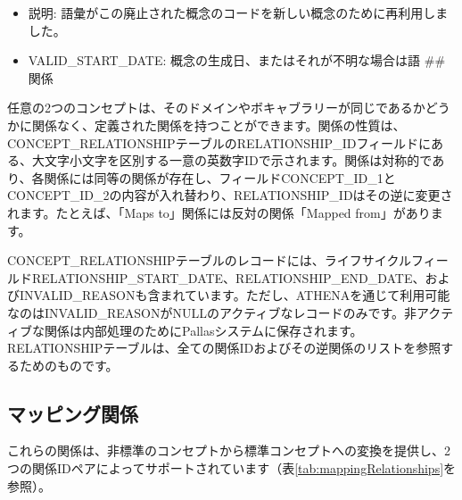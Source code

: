 \documentclass[
  11pt]{book}
\providecommand{\tightlist}{%
  \setlength{\itemsep}{0pt}\setlength{\parskip}{0pt}}
\theoremstyle{definition}
\theoremstyle{definition}
\theoremstyle{definition}
\theoremstyle{definition}
\theoremstyle{remark}
\begin{document}
\begin{itemize}
  \begin{itemize}
  \tightlist
  \item
    説明: 語彙がこの廃止された概念のコードを新しい概念のために再利用しました。
  \item
    VALID\_START\_DATE: 概念の生成日、またはそれが不明な場合は語
    \#\# 関係
  \end{itemize}
\end{itemize}

任意の2つのコンセプトは、そのドメインやボキャブラリーが同じであるかどうかに関係なく、定義された関係を持つことができます。関係の性質は、CONCEPT\_RELATIONSHIPテーブルのRELATIONSHIP\_IDフィールドにある、大文字小文字を区別する一意の英数字IDで示されます。関係は対称的であり、各関係には同等の関係が存在し、フィールドCONCEPT\_ID\_1とCONCEPT\_ID\_2の内容が入れ替わり、RELATIONSHIP\_IDはその逆に変更されます。たとえば、「Maps to」関係には反対の関係「Mapped from」があります。

CONCEPT\_RELATIONSHIPテーブルのレコードには、ライフサイクルフィールドRELATIONSHIP\_START\_DATE、RELATIONSHIP\_END\_DATE、およびINVALID\_REASONも含まれています。ただし、ATHENAを通じて利用可能なのはINVALID\_REASONがNULLのアクティブなレコードのみです。非アクティブな関係は内部処理のためにPallasシステムに保存されます。RELATIONSHIPテーブルは、全ての関係IDおよびその逆関係のリストを参照するためのものです。

\subsection{マッピング関係}\label{conceptMapping}

これらの関係は、非標準のコンセプトから標準コンセプトへの変換を提供し、2つの関係IDペアによってサポートされています（表\ref{tab:mappingRelationships}を参照）。
\end{document}
